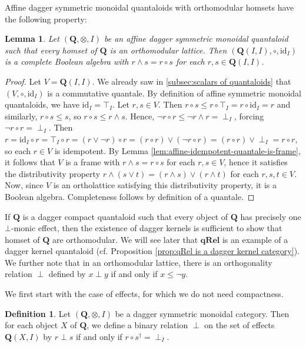 \documentclass[12pt]{tac}
\newtheorem{lemma}[theorem]{Lemma}
\theoremstyle{definition}
\newtheorem{definition}[theorem]{Definition}
\theoremstyle{remark}
\newcommand{\<}{\langle}
\renewcommand{\>}{\rangle}
\renewcommand{\:}{\colon}
\newcommand{\id}{\mathrm{id}}
\begin{document}
Affine dagger symmetric monoidal quantaloids with orthomodular homsets have the following property:
\begin{lemma}\label{lem:orthomodularity+unique-perp-monic-effects-implies-affine-and-boolean-scalars}
Let $(\mathbf Q,\otimes, I)$ be an affine dagger symmetric monoidal quantaloid such that every homset of $\mathbf Q$ is an orthomodular lattice. Then $(\mathbf Q(I,I),\circ,\id_I)$ is a complete Boolean algebra with $r\wedge s=r\circ s$ for each $r,s\in\mathbf Q(I,I)$.   
\end{lemma}
\begin{proof}
  Let $V=\mathbf Q(I,I)$.
We already saw in \ref{subsec:scalars of quantaloids} that $(V,\circ,\id_I)$ is a commutative quantale. By definition of affine symmetric monoidal quantaloids, we have $\id_I=\top_I$. Let $r,s\in V$. Then $r\circ s\leq r\circ \top_I= r\circ \id_I=r$ and similarly, $r\circ s\leq s$, so $r\circ  s\leq r\wedge s$. Hence, $\neg r\circ r\leq \neg r\wedge r=\perp_I$, forcing $\neg r\circ r=\perp_I$. Then $r=\id_I\circ r=\top_I\circ r=(r\vee \neg r)\circ r=(r\circ r)\vee (\neg r\circ r)=(r\circ r)\vee \perp_I=r\circ r$, so each $r\in V$ is idempotent. By Lemma \ref{lem:affine-idempotent-quantale-is-frame}, it follows that $V$ is a frame with $r\wedge s=r\circ s$ for each $r,s\in V$, hence it satisfies the distributivity property $r\wedge (s\vee t)=(r\wedge s)\vee(r\wedge t)$ for each $r,s,t\in V$. Now, since $V$ is an ortholattice satisfying this distributivity property, it is a Boolean algebra. Completeness follows by definition of a quantale. 
\end{proof}


If $\mathbf Q$ is a dagger compact quantaloid such that every object of $\mathbf Q$ has precisely one $\bot$-monic effect, then the existence of dagger kernels is sufficient to show that homset of $\mathbf Q$ are orthomodular. We will see later that $\mathbf{qRel}$ is an example of a dagger kernel quantaloid (cf. Proposition \ref{prop:qRel is a dagger kernel category}). We further note that in an orthomodular lattice, there is an orthogonality relation $\perp$ defined by $x\perp y$ if and only if $x\leq \neg y$. 



We first start with the case of effects, for which we do not need compactness.

\begin{definition}\label{def:orthogonality effects}
    Let $(\mathbf Q,\otimes,I)$ be a dagger symmetric monoidal category. Then for each object $X$ of $\mathbf Q$, we define a binary relation $\perp$ on the set of effects $\mathbf Q(X,I)$ by $r\perp s$ if and only if $r\circ s^\dag=\perp_I$. 
\end{definition}
\end{document}
